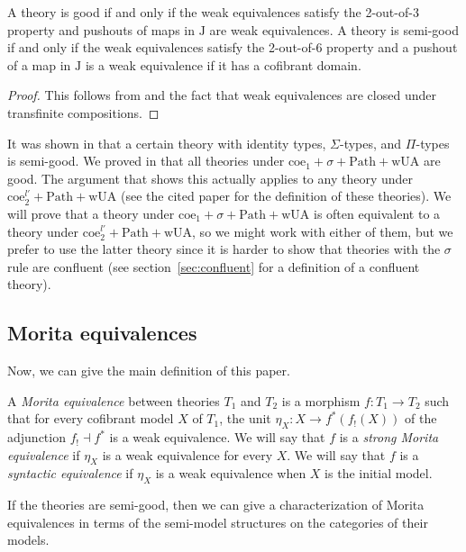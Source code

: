 \documentclass[reqno]{amsart}
\theoremstyle{definition}
\theoremstyle{remark}
\newcommand{\wUA}{\mathrm{wUA}}
\newcommand{\coeT}{\mathrm{coe}}
\newcommand{\PathT}{\mathrm{Path}}
\newcommand{\J}{\mathrm{J}}
\numberwithin{figure}{section}
\begin{document}
\begin{prop}
A theory is good if and only if the weak equivalences satisfy the 2-out-of-3 property and pushouts of maps in $\J$ are weak equivalences.
A theory is semi-good if and only if the weak equivalences satisfy the 2-out-of-6 property and a pushout of a map in $\J$ is a weak equivalence if it has a cofibrant domain.
\end{prop}
\begin{proof}
This follows from \cite[Proposition~3.1]{f-model-structures} and the fact that weak equivalences are closed under transfinite compositions.
\end{proof}

It was shown in \cite{kap-lum-model} that a certain theory with identity types, $\Sigma$-types, and $\Pi$-types is semi-good.
We proved in \cite{alg-models} that all theories under $\coeT_1 + \sigma + \PathT + \wUA$ are good.
The argument that shows this actually applies to any theory under $\coeT^{l'}_2 + \PathT + \wUA$ (see the cited paper for the definition of these theories).
We will prove that a theory under $\coeT_1 + \sigma + \PathT + \wUA$ is often equivalent to a theory under $\coeT^{l'}_2 + \PathT + \wUA$, so we might work with either of them,
but we prefer to use the latter theory since it is harder to show that theories with the $\sigma$ rule are confluent (see section~\ref{sec:confluent} for a definition of a confluent theory).

\subsection{Morita equivalences}

Now, we can give the main definition of this paper.

\begin{defn}
A \emph{Morita equivalence} between theories $T_1$ and $T_2$ is a morphism $f : T_1 \to T_2$ such that for every cofibrant model $X$ of $T_1$,
the unit $\eta_X : X \to f^*(f_!(X))$ of the adjunction $f_! \dashv f^*$ is a weak equivalence.
We will say that $f$ is a \emph{strong Morita equivalence} if $\eta_X$ is a weak equivalence for every $X$.
We will say that $f$ is a \emph{syntactic equivalence} if $\eta_X$ is a weak equivalence when $X$ is the initial model.
\end{defn}

If the theories are semi-good, then we can give a characterization of Morita equivalences in terms of the semi-model structures on the categories of their models.
\end{document}

